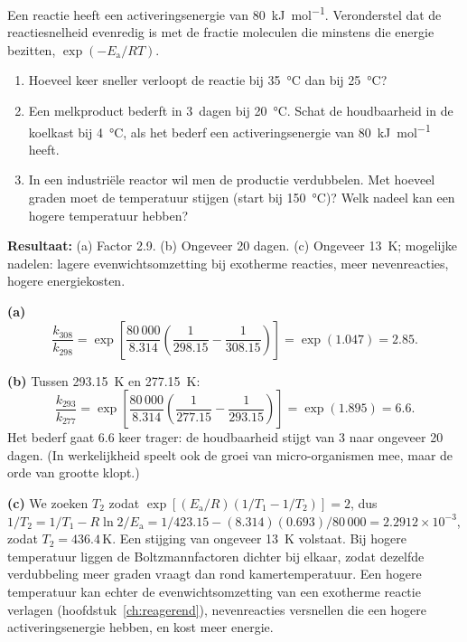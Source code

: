 \begin{oefening}
Een reactie heeft een activeringsenergie van \SI{80}{\kilo\joule\per\mole}. Veronderstel dat de reactiesnelheid evenredig is met de fractie moleculen die minstens die energie bezitten, $\exp(-E_\mathrm{a}/RT)$.
\begin{enumerate}
\item[(a)] Hoeveel keer sneller verloopt de reactie bij \SI{35}{\celsius} dan bij \SI{25}{\celsius}?
\item[(b)] Een melkproduct bederft in \SI{3}{dagen} bij \SI{20}{\celsius}. Schat de houdbaarheid in de koelkast bij \SI{4}{\celsius}, als het bederf een activeringsenergie van \SI{80}{\kilo\joule\per\mole} heeft.
\item[(c)] In een industri\"ele reactor wil men de productie verdubbelen. Met hoeveel graden moet de temperatuur stijgen (start bij \SI{150}{\celsius})? Welk nadeel kan een hogere temperatuur hebben?
\end{enumerate}
\end{oefening}
\begin{oplossing}
\textbf{Resultaat:} (a) Factor 2.9. (b) Ongeveer 20 dagen. (c) Ongeveer \SI{13}{\kelvin}; mogelijke nadelen: lagere evenwichtsomzetting bij exotherme reacties, meer nevenreacties, hogere energiekosten.

\textbf{(a)}
\[
\frac{k_{308}}{k_{298}} = \exp\!\left[\frac{80\,000}{8.314}\left(\frac{1}{298.15}-\frac{1}{308.15}\right)\right] = \exp(1.047) = 2.85.
\]

\textbf{(b)} Tussen \SI{293.15}{\kelvin} en \SI{277.15}{\kelvin}:
\[
\frac{k_{293}}{k_{277}} = \exp\!\left[\frac{80\,000}{8.314}\left(\frac{1}{277.15}-\frac{1}{293.15}\right)\right] = \exp(1.895) = 6.6.
\]
Het bederf gaat 6.6 keer trager: de houdbaarheid stijgt van 3 naar ongeveer 20 dagen. (In werkelijkheid speelt ook de groei van micro-organismen mee, maar de orde van grootte klopt.)

\textbf{(c)} We zoeken $T_2$ zodat $\exp[(E_\mathrm{a}/R)(1/T_1 - 1/T_2)] = 2$, dus $1/T_2 = 1/T_1 - R\ln 2/E_\mathrm{a} = 1/423.15 - (8.314)(0.693)/80\,000 = 2.2912\times10^{-3}$, zodat $T_2 = 436.4\,\mathrm{K}$. Een stijging van ongeveer \SI{13}{\kelvin} volstaat. Bij hogere temperatuur liggen de Boltzmannfactoren dichter bij elkaar, zodat dezelfde verdubbeling meer graden vraagt dan rond kamertemperatuur. Een hogere temperatuur kan echter de evenwichtsomzetting van een exotherme reactie verlagen (hoofdstuk~\ref{ch:reagerend}), nevenreacties versnellen die een hogere activeringsenergie hebben, en kost meer energie.
\end{oplossing}
